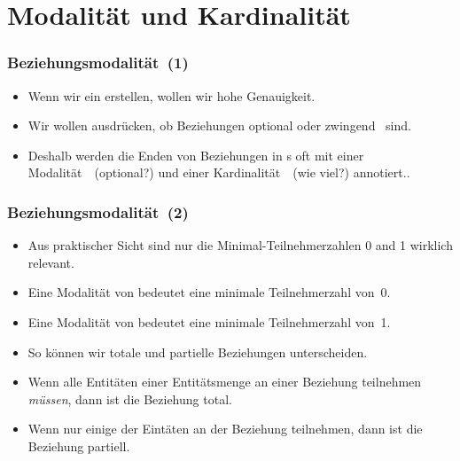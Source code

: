 \documentclass[aspectratio=169,mathserif,notheorems]{beamer}%
\begin{document}
\section{Modalität und Kardinalität}%
%
\begin{frame}%
\frametitle{Beziehungsmodalität~(1)}%
\begin{itemize}%
\item Wenn wir ein  erstellen, wollen wir hohe Genauigkeit.%
\item<2-> Wir wollen ausdrücken, ob Beziehungen optional oder zwingend~ sind.%
\item<3-> Deshalb werden die Enden von Beziehungen in s oft mit einer Modalität~~(optional?) und einer Kardinalität~~(wie viel?) annotiert.\cite{R2024CDS:E}.%
\end{itemize}%
%
%
\end{frame}%
%
\begin{frame}%
\frametitle{Beziehungsmodalität~(2)}%
\begin{itemize}%
\item Aus praktischer Sicht sind nur die Minimal-Teilnehmerzahlen 0 and 1 wirklich relevant.%
%
\item<2-> Eine Modalität von  bedeutet eine minimale Teilnehmerzahl von~0.%
%
\item<3-> Eine Modalität von  bedeutet eine minimale Teilnehmerzahl von~1.%
%
\item<4-> So können wir totale und partielle Beziehungen unterscheiden\cite{P2006CITRD:ERMI,V1999C5DMS:CDUTERM}.%
%
\item<5-> Wenn alle Entitäten einer Entitätsmenge an einer Beziehung teilnehmen \emph{müssen}, dann ist die Beziehung total.%
%
\item<6-> Wenn nur einige der Eintäten an der Beziehung teilnehmen, dann ist die Beziehung partiell.%
\end{itemize}%
\end{frame}%
%
\end{document}
